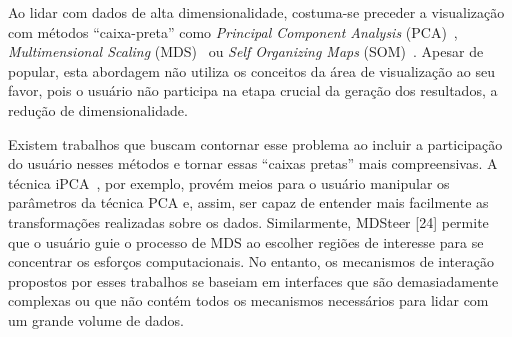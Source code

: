 




Ao lidar com dados de alta dimensionalidade, costuma-se preceder a visualização com métodos ``caixa-preta'' como \textit{Principal Component Analysis} (PCA)~\cite{Wold1987},  \textit{Multimensional Scaling} (MDS)~\cite{Mead1992} ou \textit{Self Organizing Maps} (SOM)~\cite{Kohonen1990}. Apesar de popular, esta abordagem não utiliza os conceitos da área de visualização ao seu favor, pois o usuário não participa na etapa crucial da geração dos resultados, a redução de dimensionalidade.



Existem trabalhos que buscam contornar esse problema ao incluir a participação do usuário nesses métodos e tornar essas ``caixas pretas'' mais compreensivas. A técnica iPCA~\cite{Jeong2009}, por exemplo, provém meios para o usuário manipular os parâmetros da técnica PCA e, assim, ser capaz de entender mais facilmente as transformações realizadas sobre os dados. Similarmente, MDSteer [24] permite que o usuário guie o processo de MDS ao escolher regiões de interesse para se concentrar os esforços computacionais. No entanto, os mecanismos de interação propostos por esses trabalhos se baseiam em interfaces que são demasiadamente complexas ou que não contém todos os mecanismos necessários para lidar com um grande volume de dados.

